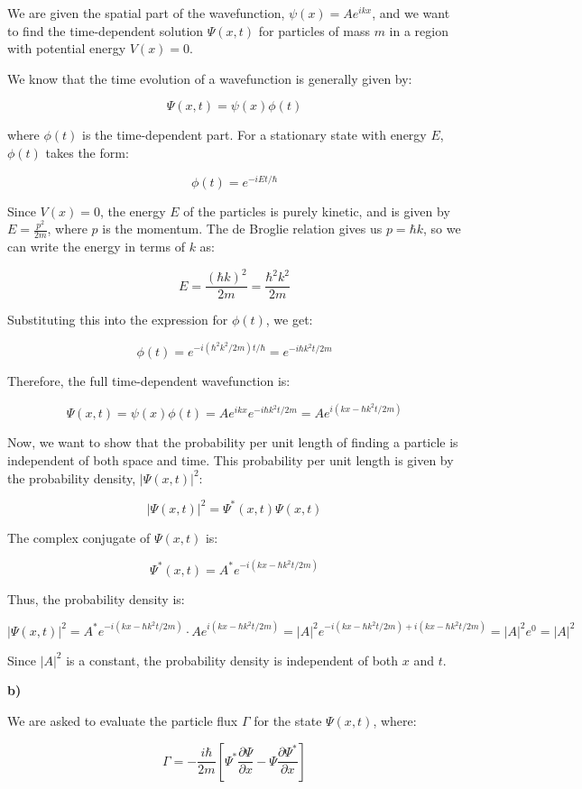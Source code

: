 \documentclass{article}
\begin{document}
We are given the spatial part of the wavefunction, $\psi(x) = A e^{ikx}$, and we want to find the time-dependent solution $\Psi(x,t)$ for particles of mass $m$ in a region with potential energy $V(x) = 0$.

We know that the time evolution of a wavefunction is generally given by:

\[ \Psi(x,t) = \psi(x) \phi(t) \]

where $\phi(t)$ is the time-dependent part.  For a stationary state with energy $E$, $\phi(t)$ takes the form:

\[ \phi(t) = e^{-iEt/\hbar} \]

Since $V(x) = 0$, the energy $E$ of the particles is purely kinetic, and is given by $E = \frac{p^2}{2m}$, where $p$ is the momentum. The de Broglie relation gives us $p = \hbar k$, so we can write the energy in terms of $k$ as:

\[ E = \frac{(\hbar k)^2}{2m} = \frac{\hbar^2 k^2}{2m} \]

Substituting this into the expression for $\phi(t)$, we get:

\[ \phi(t) = e^{-i(\hbar^2 k^2 / 2m)t/\hbar} = e^{-i \hbar k^2 t / 2m} \]

Therefore, the full time-dependent wavefunction is:

\[ \Psi(x,t) = \psi(x) \phi(t) = A e^{ikx} e^{-i \hbar k^2 t / 2m} = A e^{i(kx - \hbar k^2 t / 2m)} \]

Now, we want to show that the probability per unit length of finding a particle is independent of both space and time. This probability per unit length is given by the probability density, $|\Psi(x,t)|^2$:

\[ |\Psi(x,t)|^2 = \Psi^*(x,t) \Psi(x,t) \]

The complex conjugate of $\Psi(x,t)$ is:

\[ \Psi^*(x,t) = A^* e^{-i(kx - \hbar k^2 t / 2m)} \]

Thus, the probability density is:

\[ |\Psi(x,t)|^2 = A^* e^{-i(kx - \hbar k^2 t / 2m)} \cdot A e^{i(kx - \hbar k^2 t / 2m)} = |A|^2 e^{-i(kx - \hbar k^2 t / 2m) + i(kx - \hbar k^2 t / 2m)} = |A|^2 e^0 = |A|^2 \]

Since $|A|^2$ is a constant, the probability density is independent of both $x$ and $t$.

\textbf{b)}

We are asked to evaluate the particle flux $\Gamma$ for the state $\Psi(x,t)$, where:

\[ \Gamma = -\frac{i \hbar}{2m} \left[ \Psi^* \frac{\partial \Psi}{\partial x} - \Psi \frac{\partial \Psi^*}{\partial x} \right] \]
\end{document}
